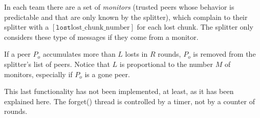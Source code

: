 
\label{sec:free_riding_control}

In each team there are a set of \emph{monitors} (trusted peers whose
behavior is predictable and that are only known by the splitter),
which complain to their splitter with a $[\mathtt{lost}
  \text{lost\_chunk\_number}]$ for each lost chunk. The splitter only
considers these type of messages if they come from a monitor.

If a peer $P_o$ accumulates more than $L$ losts in $R$ rounds, $P_o$
is removed from the splitter's list of peers. Notice that $L$ is
proportional to the number $M$ of monitors, especially if $P_o$ is a
gone peer.

\begin{notex}
This last functionality has not been implemented, at least, as it has been explained here. The forget() thread is controlled by a timer, not by a counter of rounds.
\end{notex}
